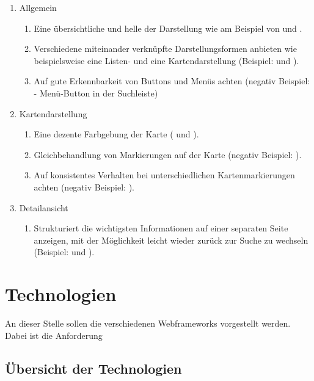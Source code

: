 \documentclass[../Bachelorarbeit.tex]{subfiles}
\begin{document}
\begin{enumerate}
	\item Allgemein
	\begin{enumerate}
		\item[] Eine übersichtliche und helle der Darstellung wie am Beispiel von  und .
		\item[] Verschiedene miteinander verknüpfte Darstellungsformen anbieten wie beispielsweise eine Listen- und eine Kartendarstellung (Beispiel:  und ).
		\item[] Auf gute Erkennbarkeit von Buttons und Menüs achten (negativ Beispiel:  - Menü-Button in der Suchleiste)
	\end{enumerate}
	\item Kartendarstellung
	\begin{enumerate}
		\item[] Eine dezente Farbgebung der Karte ( und ).
		\item[] Gleichbehandlung von Markierungen auf der Karte (negativ Beispiel: ).
		\item[] Auf konsistentes Verhalten bei unterschiedlichen Kartenmarkierungen achten (negativ Beispiel: ).
	\end{enumerate}
	\item Detailansicht
	\begin{enumerate}
		\item[] Strukturiert die wichtigsten Informationen auf einer separaten Seite anzeigen, mit der Möglichkeit leicht wieder zurück zur Suche zu wechseln (Beispiel:  und ).
	\end{enumerate}
\end{enumerate}

\section{Technologien}
An dieser Stelle sollen die verschiedenen Webframeworks vorgestellt werden.
Dabei ist die Anforderung
\subsection{Übersicht der Technologien}
\end{document}
